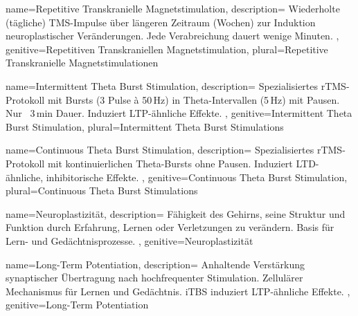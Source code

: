 
{
	name=Repetitive Transkranielle Magnetstimulation,
	description={
			Wiederholte (tägliche) \gls{TMS}-Impulse über längeren Zeitraum (Wochen) zur Induktion neuroplastischer Veränderungen. Jede Verabreichung dauert wenige Minuten.\newline
		},
	genitive=Repetitiven Transkraniellen Magnetstimulation,
	plural=Repetitive Transkranielle Magnetstimulationen
}


{
	name=Intermittent Theta Burst Stimulation,
	description={
			Spezialisiertes \gls{rTMS}-Protokoll mit Bursts (3 Pulse à 50\,Hz) in Theta-Intervallen (5\,Hz) mit Pausen. Nur ~3\,min Dauer. Induziert \gls{LTP}-ähnliche Effekte. \cite{huang_theta_2005, hoy_enhancement_2016}\newline
		},
	genitive=Intermittent Theta Burst Stimulation,
	plural=Intermittent Theta Burst Stimulations
}


{
	name=Continuous Theta Burst Stimulation,
	description={
			Spezialisiertes \gls{rTMS}-Protokoll mit kontinuierlichen Theta-Bursts ohne Pausen. Induziert \gls{LTD}-ähnliche, inhibitorische Effekte. \cite{huang_theta_2005}\newline
		},
	genitive=Continuous Theta Burst Stimulation,
	plural=Continuous Theta Burst Stimulations
}



{
	name=Neuroplastizität,
	description={
			Fähigkeit des Gehirns, seine Struktur und Funktion durch Erfahrung, Lernen oder Verletzungen zu verändern. Basis für Lern- und Gedächtnisprozesse.\newline
		},
	genitive=Neuroplastizität
}

{
	name=Long-Term Potentiation,
	description={
			Anhaltende Verstärkung synaptischer Übertragung nach hochfrequenter Stimulation. Zellulärer Mechanismus für Lernen und Gedächtnis. \gls{iTBS} induziert LTP-ähnliche Effekte. \cite{esser_level_2006, cavaleiro_memory_2020}\newline
		},
	genitive=Long-Term Potentiation
}

